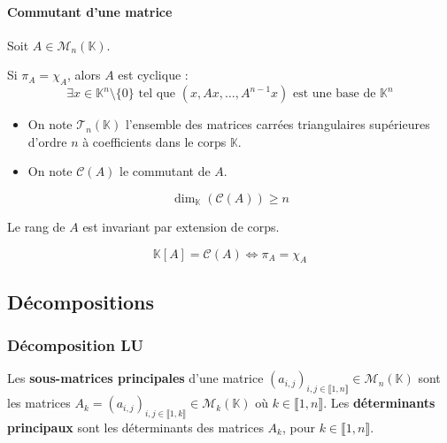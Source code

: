   \paragraph{Commutant d'une matrice}

  Soit $A \in \mathcal{M}_n(\mathbb{K})$.


  \begin{lemma}
    Si $\pi_A = \chi_A$, alors $A$ est cyclique :
    \[ \exists x \in \mathbb{K}^n \setminus \{ 0 \} \text{ tel que } (x, Ax, \dots, A^{n-1}x) \text{ est une base de } \mathbb{K}^n \]
  \end{lemma}


  \begin{notation}
    \begin{itemize}
      \item On note $\mathcal{T}_n(\mathbb{K})$ l'ensemble des matrices carrées triangulaires supérieures d'ordre $n$ à coefficients dans le corps $\mathbb{K}$.
      \item On note $\mathcal{C}(A)$ le commutant de $A$.
    \end{itemize}
  \end{notation}

  \begin{lemma}
    \[ \dim_{\mathbb{K}}(\mathcal{C}(A)) \geq n \]
  \end{lemma}

  \begin{lemma}
    Le rang de $A$ est invariant par extension de corps.
  \end{lemma}


  \begin{theorem}
    \[ \mathbb{K}[A] = \mathcal{C}(A) \iff \pi_A = \chi_A \]
  \end{theorem}

  \subsection{Décompositions}

  \subsubsection{Décomposition LU}


  \begin{definition}
    Les \textbf{sous-matrices principales} d'une matrice $(a_{i,j})_{i,j \in \llbracket 1, n \rrbracket} \in \mathcal{M}_n(\mathbb{K})$ sont les matrices $A_k = (a_{i,j})_{i,j \in \llbracket 1, k \rrbracket} \in \mathcal{M}_k(\mathbb{K})$ où $k \in \llbracket 1, n \rrbracket$. Les \textbf{déterminants principaux} sont les déterminants des matrices $A_k$, pour $k \in \llbracket 1, n \rrbracket$.
  \end{definition}

